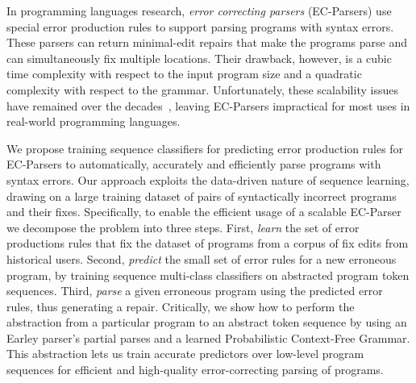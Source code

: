 In programming languages research, \emph{error
correcting parsers} (EC-Parsers) \citep{Aho_1972} use special error production
rules to support parsing programs with syntax errors. These parsers can return
minimal-edit repairs that make the programs parse and can simultaneously fix
multiple locations. Their drawback,
however, is a cubic time complexity with respect to the
input program size and a quadratic complexity with respect to the grammar.
%
Unfortunately, these scalability issues have remained over the
decades~\citep{McLean1996, Rajasekaran2014}, leaving EC-Parsers
impractical for most uses in real-world programming languages.

We propose training sequence classifiers for predicting
error
production rules for EC-Parsers to automatically, accurately and
efficiently parse programs with syntax errors. Our approach exploits the data-driven
nature of sequence learning, drawing on a large training dataset of pairs
of syntactically incorrect programs and their fixes.
%
Specifically, to enable the efficient usage of a scalable EC-Parser we decompose
the problem into three steps.
%
First, \emph{learn} the set of error productions rules that fix the dataset of
programs from a corpus of fix edits from historical users.
%
Second, \emph{predict} the small set of error rules for a new erroneous program,
by training sequence multi-class classifiers on abstracted program token
sequences.
%
Third, \emph{parse} a given erroneous program using the predicted error rules,
thus generating a repair.
%
Critically, we show how to perform the abstraction from a particular
program to an abstract token sequence by using an Earley parser's
\citep{Earley_1970} partial parses and a learned Probabilistic Context-Free
Grammar. This abstraction lets us train accurate predictors over low-level
program sequences for efficient and high-quality
error-correcting parsing of programs.

